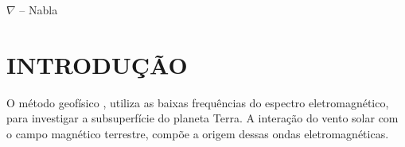 \documentclass[12pt,twoside,oneright,a4paper,chapter=TITLE,english,brazil]{unipampa}
\begin{document}
\begin{simbolos}
    \item[$ \nabla $ -- ]       Nabla
\end{simbolos}


\tableofcontents       %


%
%
\textual                    %
\pagestyle{simple}          %
\OnehalfSpacing             %

\chapter{INTRODUÇÃO}
    
     O método geofísico , utiliza as baixas frequências do espectro eletromagnético, para investigar a subsuperfície do planeta Terra. A interação do vento solar com o campo magnético terrestre, compõe a origem dessas ondas eletromagnéticas.  
    
\end{document}
